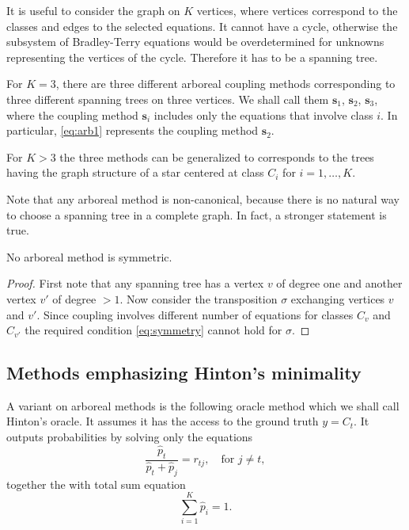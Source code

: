 It is useful to consider the graph on $K$ vertices, where vertices correspond to the classes and edges to the selected equations. It cannot have a cycle, otherwise the subsystem of Bradley-Terry equations would be overdetermined for unknowns representing the vertices of the cycle. Therefore it has to be a spanning tree.

For $K=3$, there are three different arboreal coupling methods corresponding to three different spanning trees on three vertices. We shall call them $\boldsymbol{s}_1$, $\boldsymbol{s}_2$, $\boldsymbol{s}_3$, where the coupling method $\boldsymbol{s}_i$ includes only the equations that involve class $i$. In particular, \eqref{eq:arb1} represents the coupling method $\boldsymbol{s}_2$.

For $K>3$ the three methods can be generalized to corresponds to the trees having the graph structure  of a star centered at class $C_i$ for $i=1, \ldots, K$.


Note that any arboreal method is non-canonical, because there is no natural way to choose a spanning tree in a complete graph. 
In fact, a stronger statement is true.
\begin{prop}
No arboreal method is symmetric. 
\end{prop}
\begin{proof}
First note that any spanning tree has a vertex $v$ of degree one and another vertex $v'$ of degree $>1$. Now consider the transposition $\sigma$ exchanging  vertices $v$  and $v'$. Since coupling involves different number of equations for classes $C_v$ and $C_{v'}$ the required condition \eqref{eq:symmetry} cannot hold for $\sigma$.
\end{proof}


\subsection{Methods emphasizing Hinton's minimality}

A variant on arboreal methods is the following oracle method which we shall call Hinton's oracle. It  assumes it has the access to the ground truth $y = C_t$. It outputs probabilities by solving only the equations
$$
\frac{\hat p_t}{\hat p_t + \hat p_j} = {r}_{tj},\quad \textrm{for }j\not = t,
$$
together the  with total sum equation
$$
\sum_{i=1}^K  \hat p_i = 1.
$$

